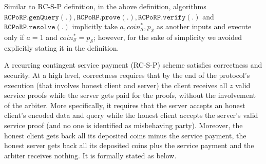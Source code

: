 Similar to RC-S-P definition, in the above definition, algorithms $\mathtt{RCPoRP}.\mathtt{genQuery}(.),\mathtt{RCPoRP}.\mathtt{prove}(.),\mathtt{RCPoRP}.\mathtt{verify}(.)$ and $\mathtt{RCPoRP}.\mathtt{resolve}(.)$ implicitly  take $a, coin^{\scriptscriptstyle*}_{\scriptscriptstyle\mathcal{S}}, p_{\scriptscriptstyle\mathcal{S}}$ as another inputs and  execute only if $a=1$ and $coin^{\scriptscriptstyle*}_{\scriptscriptstyle\mathcal{S}}=p_{\scriptscriptstyle\mathcal{S}}$; however, for the sake of simplicity we  avoided explicitly stating it  in the definition. 

A recurring contingent service payment (RC-S-P)  scheme satisfies correctness and security. At a high level, correctness requires that by the end of the protocol's execution  (that involves  honest client and server) the client receives all $z$ valid service proofs while the server gets paid  for the proofs, without the involvement of the arbiter. More specifically, it requires that the server accepts an honest client's encoded data and query while the honest client accepts the server's valid service proof (and no one is identified as misbehaving party). Moreover, the honest client gets back all its deposited coins minus the service payment, the honest server gets back all its deposited coins  plus the service payment and the arbiter receives nothing. It is formally stated as below.




